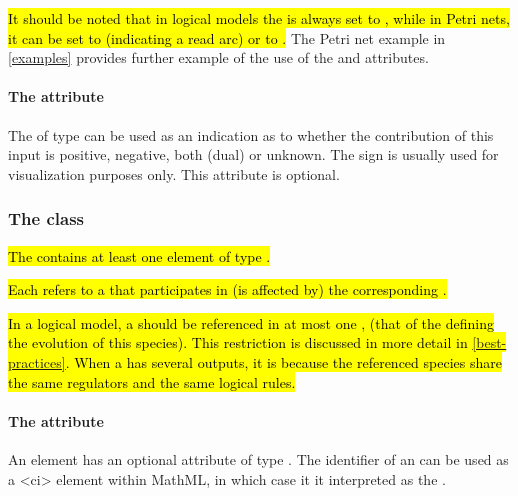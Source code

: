 \hl{It should be noted that in logical models the  is always set to , while in Petri nets, it can be set to  (indicating a read arc) or to . } The Petri net example in \ref{examples} provides further example of the use of the  and  attributes. 


 
\paragraph{The  attribute}
The  of type  can be used as an indication as to whether the contribution of this input is positive, negative, both (dual) or unknown. The sign is usually used for visualization purposes only. This attribute is optional.


\subsubsection{The  class}
\label{output-class}

\hl{The \ListOfOutputs contains at least one element of type \Output. }

\hl{Each \Output refers to a \QualitativeSpecies that participates in (is affected by) the corresponding \Transition. }


\hl{In a logical model, a \QualitativeSpecies should be referenced in at most one \ListOfOutputs, (that of the \Transition defining the evolution of this species). This restriction is discussed in more detail in \ref{best-practices}. When a \Transition has several outputs, it is because the referenced species share the same regulators and the same logical rules.} 


\paragraph{The  attribute}
An \Output element has an optional  attribute of type .  The identifier of an \Output can be used as a 
<ci> element within MathML, in which case it it interpreted as the .

